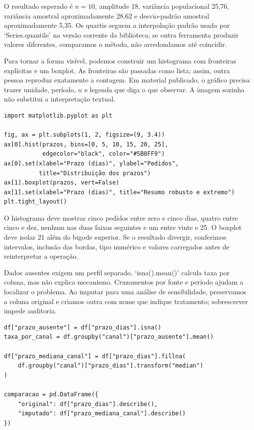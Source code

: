 O resultado esperado é $n=10$, amplitude 18, variância populacional 25,76, variância amostral aproximadamente 28,62 e desvio-padrão amostral aproximadamente 5,35. Os quartis seguem a interpolação padrão usada por `Series.quantile' na versão corrente da biblioteca; se outra ferramenta produzir valores diferentes, comparamos o método, não arredondamos até coincidir.

Para tornar a forma visível, podemos construir um histograma com fronteiras explícitas e um boxplot. As fronteiras são passadas como lista; assim, outra pessoa reproduz exatamente a contagem. Em material publicado, o gráfico precisa trazer unidade, período, $n$ e legenda que diga o que observar. A imagem sozinha não substitui a interpretação textual.

\begin{verbatim}
import matplotlib.pyplot as plt

fig, ax = plt.subplots(1, 2, figsize=(9, 3.4))
ax[0].hist(prazos, bins=[0, 5, 10, 15, 20, 25],
           edgecolor="black", color="#5B8FF9")
ax[0].set(xlabel="Prazo (dias)", ylabel="Pedidos",
          title="Distribuição dos prazos")
ax[1].boxplot(prazos, vert=False)
ax[1].set(xlabel="Prazo (dias)", title="Resumo robusto e extremo")
plt.tight_layout()
\end{verbatim}

O histograma deve mostrar cinco pedidos entre zero e cinco dias, quatro entre cinco e dez, nenhum nas duas faixas seguintes e um entre vinte e 25. O boxplot deve isolar 21 além do bigode superior. Se o resultado divergir, conferimos intervalos, inclusão das bordas, tipo numérico e valores carregados antes de reinterpretar a operação.

Dados ausentes exigem um perfil separado. `isna().mean()' calcula taxa por coluna, mas não explica mecanismo. Cruzamentos por fonte e período ajudam a localizar o problema. Ao imputar para uma análise de sensibilidade, preservamos a coluna original e criamos outra com nome que indique tratamento; sobrescrever impede auditoria.

\begin{verbatim}
df["prazo_ausente"] = df["prazo_dias"].isna()
taxa_por_canal = df.groupby("canal")["prazo_ausente"].mean()

df["prazo_mediana_canal"] = df["prazo_dias"].fillna(
    df.groupby("canal")["prazo_dias"].transform("median")
)

comparacao = pd.DataFrame({
    "original": df["prazo_dias"].describe(),
    "imputado": df["prazo_mediana_canal"].describe()
})
\end{verbatim}

